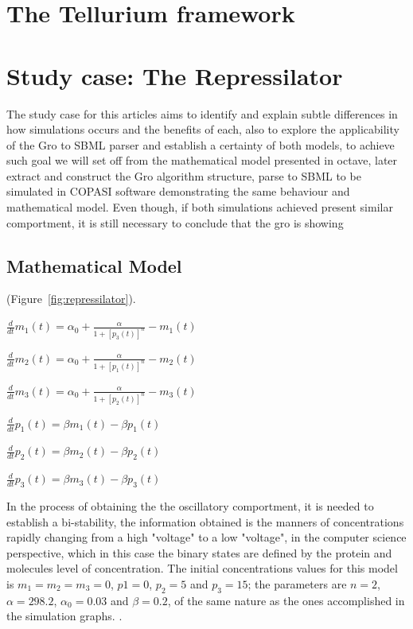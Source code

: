 \documentclass[12pt]{article}
\begin{document}
\section{The Tellurium framework}
    \lipsum[1]

\section{Study case: The Repressilator}
    \lipsum[1]
The study case for this articles aims to identify and explain subtle differences in how simulations occurs and the benefits of each, also to explore the applicability of the Gro to SBML parser and establish a certainty of both models, to achieve such goal we will set off from the mathematical model presented in octave, later extract and construct the Gro algorithm structure, parse to SBML to be simulated in COPASI software demonstrating the same behaviour and mathematical model. Even though, if both simulations achieved present similar comportment, it is still necessary to conclude that the gro is showing 

\subsection{Mathematical Model}

    \cite{Hucka2003}
    (Figure~\ref{fig:repressilator}).


$\frac{d}{dt}m_{1}(t) = \alpha_{0} + \frac{\alpha}{1 + [p_{3}(t)]^{n}} - m_{1}(t)$

$\frac{d}{dt}m_{2}(t) = \alpha_{0} + \frac{\alpha}{1 + [p_{1}(t)]^{n}} - m_{2}(t)$

$\frac{d}{dt}m_{3}(t) = \alpha_{0} + \frac{\alpha}{1 + [p_{2}(t)]^{n}} - m_{3}(t)$

$\frac{d}{dt}p_{1}(t) = \beta{m_{1}}(t) - \beta{p_{1}}(t)$

$\frac{d}{dt}p_{2}(t) = \beta{m_{2}}(t) - \beta{p_{2}}(t)$

$\frac{d}{dt}p_{3}(t) = \beta{m_{3}}(t) - \beta{p_{3}}(t)$ 

In the process of obtaining the the oscillatory comportment, it is needed to establish a bi-stability, the information obtained is the manners of concentrations rapidly changing from a high "voltage" to a low "voltage", in the computer science perspective, which in this case the binary states are defined by the protein and molecules level of concentration. The initial concentrations values for this model is $m_{1} = m_{2} = m_{3} = 0$, $p1 = 0$, $p_{2} = 5$ and $p_{3} = 15$; the parameters are $n = 2$, $\alpha = 298.2$, $\alpha_{0} = 0.03$ and $\beta = 0.2$, of the same nature as the ones accomplished in the simulation graphs. \cite{ingalls2013mathematical}.
\end{document}
